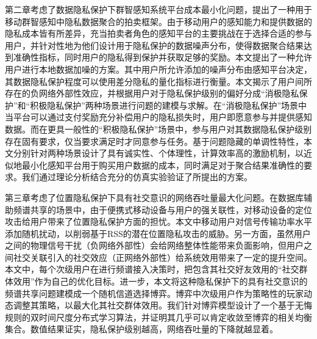 
第二章考虑了数据隐私保护下群智感知系统平台成本最小化问题，提出了一种用于移动群智感知中隐私数据聚合的拍卖框架。由于移动用户的感知能力和提供数据的隐私成本皆有所差异，充当拍卖者角色的感知平台的主要挑战在于选择合适的参与用户，并针对性地为他们设计用于隐私保护的数据噪声分布，使得数据聚合结果达到准确性指标，同时用户的隐私得到保护并获取足够的奖励。本文提出了一种允许用户进行本地数据加噪的方案。其中用户所允许添加的噪声分布由感知平台决定，其数据隐私保护程度可以使用差分隐私的量化指标进行衡量。本文揭示了用户间所存在的{\kaishu 负网络外部性}效应，并根据用户对于隐私保护级别的偏好分成“消极隐私保护”和“积极隐私保护”两种场景进行问题的建模与求解。在“消极隐私保护”场景中当平台可以通过支付奖励充分补偿用户的隐私损失时，用户即愿意参与并提供感知数据。而在更具一般性的“积极隐私保护”场景中，参与用户对其数据隐私保护级别存在固有要求，仅当要求满足时才同意参与任务。基于问题隐藏的单调性特性，本文分别针对两种场景设计了具有诚实性、个体理性，计算效率高的激励机制，以近似地最小化感知平台用于购买用户数据的成本，同时满足对于聚合结果准确性的要求。我们通过理论分析结合充分的仿真实验验证了所提出的方案。

第三章考虑了位置隐私保护下具有社交意识的网络吞吐量最大化问题。在数据库辅助频谱共享的场景中，由于便携式移动设备与用户的强关联性，对移动设备的定位攻击给用户带来了位置隐私保护方面的担忧。本文中移动用户对信号传输功率水平添加随机扰动，以削弱基于RSS的潜在位置隐私攻击的威胁。另一方面，虽然用户之间的物理信号干扰（{\kaishu 负网络外部性}）会给网络整体性能带来负面影响，但用户之间社交关联引入的社交效应（{\kaishu 正网络外部性}）给系统效用带来了一定的提升空间。本文中，每个次级用户在进行频谱接入决策时，把包含其社交好友效用的“社交群体效用”作为自己的优化目标。进一步，本文将这种隐私保护下的具有社交意识的频谱共享问题建模成一个随机信道选择博弈。博弈中次级用户作为策略性的玩家动态调整其策略，以最大化其社交群体效用。我们针对博弈模型设计了一个基于无悔规则的双时间尺度分布式学习算法，并证明其几乎可以肯定收敛至博弈的相关均衡集合。数值结果证实，隐私保护级别越高，网络吞吐量的下降就越显着。

